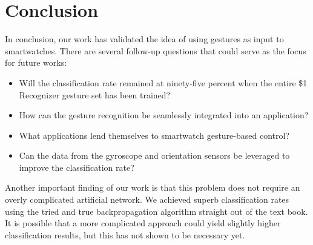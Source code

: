 \documentclass{report}
\begin{document}
\chapter{Conclusion}

In conclusion, our work has validated the idea of using gestures as input to smartwatches. There are several follow-up questions that could serve as the focus for future works:

\begin{itemize}
\item Will the classification rate remained at ninety-five percent when the entire \$1 Recognizer gesture set has been trained?
\item How can the gesture recognition be seamlessly integrated into an application?
\item What applications lend themselves to smartwatch gesture-based control?
\item Can the data from the gyroscope and orientation sensors be leveraged to improve the classification rate?
\end{itemize}

Another important finding of our work is that this problem does not require an overly complicated artificial network. We achieved superb classification rates using the tried and true backpropagation algorithm straight out of the text book. It is possible that a more complicated approach could yield slightly higher classification results, but this has not shown to be necessary yet. 

\printbibliography
\end{document}
